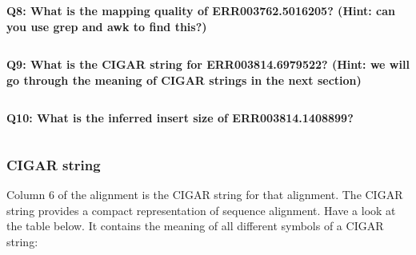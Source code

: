 \documentclass[11pt]{article}
\makeatletter
\newcommand{\boxspacing}{\kern\kvtcb@left@rule\kern\kvtcb@boxsep}
\newcommand{\prompt}[4]{
        {\ttfamily\llap{{\color{#2}[#3]:\hspace{3pt}#4}}\vspace{-\baselineskip}}
    }
\makeatother
\begin{document}
    \textbf{Q8: What is the mapping quality of ERR003762.5016205? (Hint: can
you use grep and awk to find this?)}

    \begin{tcolorbox}[breakable, size=fbox, boxrule=1pt, pad at break*=1mm,colback=cellbackground, colframe=cellborder]
\prompt{In}{incolor}{ }{\boxspacing}
\begin{Verbatim}[commandchars=\\\{\}]

\end{Verbatim}
\end{tcolorbox}

    \textbf{Q9: What is the CIGAR string for ERR003814.6979522? (Hint: we
will go through the meaning of CIGAR strings in the next section)}

    \begin{tcolorbox}[breakable, size=fbox, boxrule=1pt, pad at break*=1mm,colback=cellbackground, colframe=cellborder]
\prompt{In}{incolor}{ }{\boxspacing}
\begin{Verbatim}[commandchars=\\\{\}]

\end{Verbatim}
\end{tcolorbox}

    \textbf{Q10: What is the inferred insert size of ERR003814.1408899?}

    \begin{tcolorbox}[breakable, size=fbox, boxrule=1pt, pad at break*=1mm,colback=cellbackground, colframe=cellborder]
\prompt{In}{incolor}{ }{\boxspacing}
\begin{Verbatim}[commandchars=\\\{\}]

\end{Verbatim}
\end{tcolorbox}

    \hypertarget{cigar-string}{%
\subsubsection{CIGAR string}\label{cigar-string}}

Column 6 of the alignment is the CIGAR string for that alignment. The
CIGAR string provides a compact representation of sequence alignment.
Have a look at the table below. It contains the meaning of all different
symbols of a CIGAR string:
\end{document}
